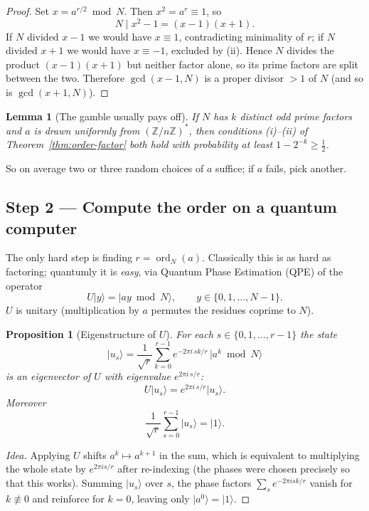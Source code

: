 \documentclass[11pt]{article}
\theoremstyle{plain}
\newtheorem{lemma}[theorem]{Lemma}
\newtheorem{proposition}[theorem]{Proposition}
\theoremstyle{definition}
\theoremstyle{remark}
\newcommand{\Z}{\mathbb{Z}}
\newcommand{\Zn}{(\Z/n\Z)^{\!*}}
\newcommand{\ket}[1]{\lvert #1 \rangle}
\DeclareMathOperator{\ord}{ord}
\begin{document}
\begin{proof}
Set $x=a^{r/2}\bmod N$. Then $x^{2}=a^{r}\equiv 1$, so
\[
  N \mid x^{2}-1 = (x-1)(x+1).
\]
If $N$ divided $x-1$ we would have $x\equiv 1$, contradicting minimality of $r$; if $N$
divided $x+1$ we would have $x\equiv -1$, excluded by (ii). Hence $N$ divides the product
$(x-1)(x+1)$ but neither factor alone, so its prime factors are split between the two.
Therefore $\gcd(x-1,N)$ is a proper divisor $>1$ of $N$ (and so is $\gcd(x+1,N)$).
\end{proof}

\begin{lemma}[The gamble usually pays off]\label{lem:prob}
If $N$ has $k$ distinct odd prime factors and $a$ is drawn uniformly from $\Zn$, then
conditions (i)--(ii) of Theorem~\ref{thm:order-factor} both hold with probability at
least $1-2^{-k}\ge \tfrac12$.
\end{lemma}

So on average two or three random choices of $a$ suffice; if $a$ fails, pick another.

\subsection{Step 2 --- Compute the order on a quantum computer}

The only hard step is finding $r=\ord_N(a)$. Classically this is as hard as factoring;
quantumly it is \emph{easy}, via Quantum Phase Estimation (QPE) of the operator
\[
  U\ket{y} = \ket{ay \bmod N}, \qquad y\in\{0,1,\dots,N-1\}.
\]
$U$ is unitary (multiplication by $a$ permutes the residues coprime to $N$).

\begin{proposition}[Eigenstructure of $U$]\label{prop:eig}
For each $s\in\{0,1,\dots,r-1\}$ the state
\[
  \ket{u_s} = \frac{1}{\sqrt r}\sum_{k=0}^{r-1} e^{-2\pi i\, s k / r}\,\ket{a^{k}\bmod N}
\]
is an eigenvector of $U$ with eigenvalue $e^{2\pi i\, s/r}$:
\[
  U\ket{u_s} = e^{2\pi i\, s/r}\ket{u_s}.
\]
Moreover
\[
  \frac{1}{\sqrt r}\sum_{s=0}^{r-1}\ket{u_s} = \ket{1}.
\]
\end{proposition}

\begin{proof}[Idea]
Applying $U$ shifts $a^{k}\mapsto a^{k+1}$ in the sum, which is equivalent to multiplying
the whole state by $e^{2\pi i s/r}$ after re-indexing (the phases were chosen precisely so
that this works). Summing $\ket{u_s}$ over $s$, the phase factors
$\sum_s e^{-2\pi i s k/r}$ vanish for $k\not\equiv 0$ and reinforce for $k=0$, leaving only
$\ket{a^{0}}=\ket{1}$. \end{proof}
\end{document}
